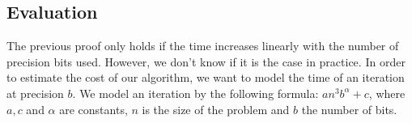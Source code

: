 \documentclass[sigplan]{acmart}
\begin{document}
   \subsection{Evaluation}
   
   The previous proof only holds if the time increases linearly with the number of precision bits used. However, we don't know if it is the case in practice.
   In order to estimate the cost of our algorithm, we want to model the time of an iteration at precision $b$. We model an iteration by the following formula: $an^3b^\alpha+c$, where $a,c$ and $\alpha$ are constants,
   $n$ is the size of the problem and $b$ the number of bits.
   

\end{document}
